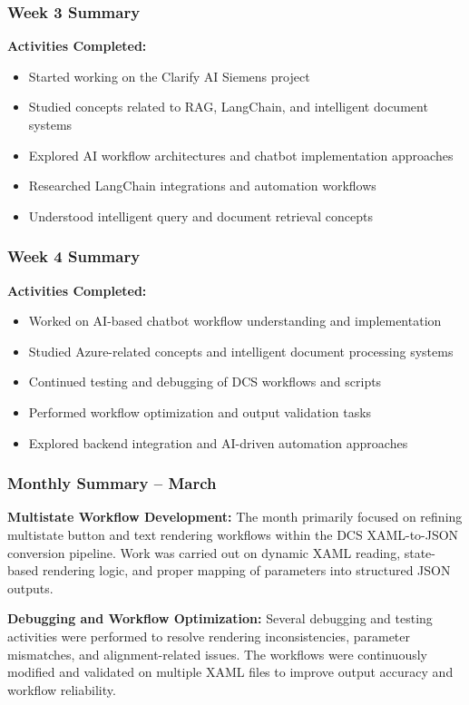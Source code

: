 \documentclass[12pt,a4paper]{report}
\begin{document}
\subsubsection*{Week 3 Summary}
\textbf{Activities Completed:}
\begin{itemize}[leftmargin=1.5cm]
    \item Started working on the Clarify AI Siemens project
    \item Studied concepts related to RAG, LangChain, and intelligent document systems
    \item Explored AI workflow architectures and chatbot implementation approaches
    \item Researched LangChain integrations and automation workflows
    \item Understood intelligent query and document retrieval concepts
\end{itemize}

\subsubsection*{Week 4 Summary}
\textbf{Activities Completed:}
\begin{itemize}[leftmargin=1.5cm]
    \item Worked on AI-based chatbot workflow understanding and implementation
    \item Studied Azure-related concepts and intelligent document processing systems
    \item Continued testing and debugging of DCS workflows and scripts
    \item Performed workflow optimization and output validation tasks
    \item Explored backend integration and AI-driven automation approaches
\end{itemize}

\subsubsection*{Monthly Summary -- March}
\textbf{Multistate Workflow Development:}
The month primarily focused on refining multistate button and text rendering workflows within the DCS XAML-to-JSON conversion pipeline. Work was carried out on dynamic XAML reading, state-based rendering logic, and proper mapping of parameters into structured JSON outputs.

\textbf{Debugging and Workflow Optimization:}
Several debugging and testing activities were performed to resolve rendering inconsistencies, parameter mismatches, and alignment-related issues. The workflows were continuously modified and validated on multiple XAML files to improve output accuracy and workflow reliability.
\end{document}
